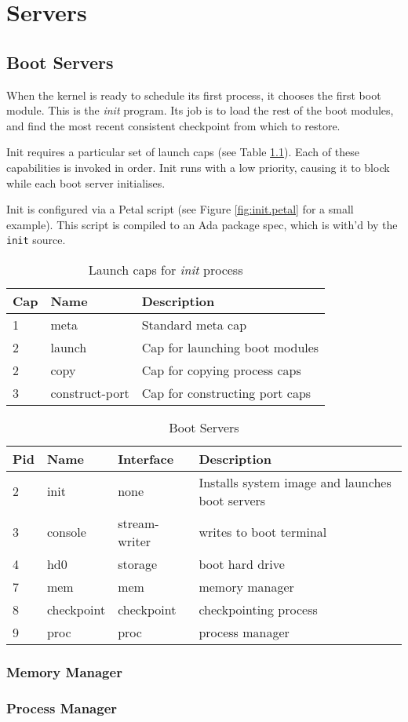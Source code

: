 \chapter{Servers}

\section{Boot Servers}

When the kernel is ready to schedule its first process, it chooses the first boot module.  This is the {\em init} program.  Its job is to load the rest of the boot modules, and find the most recent consistent checkpoint from which to restore.

Init requires a particular set of launch caps (see Table \ref{table:init-launch-caps}).  Each of these capabilities is invoked in order.  Init runs with a low priority, causing it to block while each boot server initialises.

Init is configured via a Petal script (see Figure \ref{fig:init.petal} for a small example).  This script is compiled to an Ada package spec, which is with'd by the {\tt init} source.


\begin{table}[ht]
\begin{tabular}{l l l}
\hline\hline
Cap & Name & Description \\
\hline
1 & meta & Standard meta cap \\
2 & launch & Cap for launching boot modules \\
2 & copy & Cap for copying process caps \\
3 & construct-port & Cap for constructing port caps \\
\hline
\end{tabular}
\caption{Launch caps for {\em init} process}
\label{table:init-launch-caps}
\end{table}

\begin{table}[ht]
\begin{tabular}{l l l l}
\hline\hline
Pid & Name & Interface & Description \\
\hline
2 & init & none & Installs system image and launches boot servers \\
3 & console & stream-writer & writes to boot terminal \\
4 & hd0 & storage & boot hard drive \\
7 & mem & mem & memory manager \\
8 & checkpoint & checkpoint & checkpointing process \\
9 & proc & proc & process manager \\
\hline
\end{tabular}
\caption{Boot Servers}
\label{table:boot_servers}
\end{table}

\subsection{Memory Manager}


\subsection{Process Manager}
